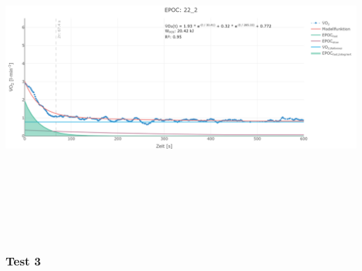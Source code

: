 \documentclass[
  letterpaper,
  DIV=11]{scrartcl}
\begin{document}
\includegraphics[width=11.45833in,height=4.6875in]{images/22_2.png}

\subsubsection{Test 3}
\end{document}
